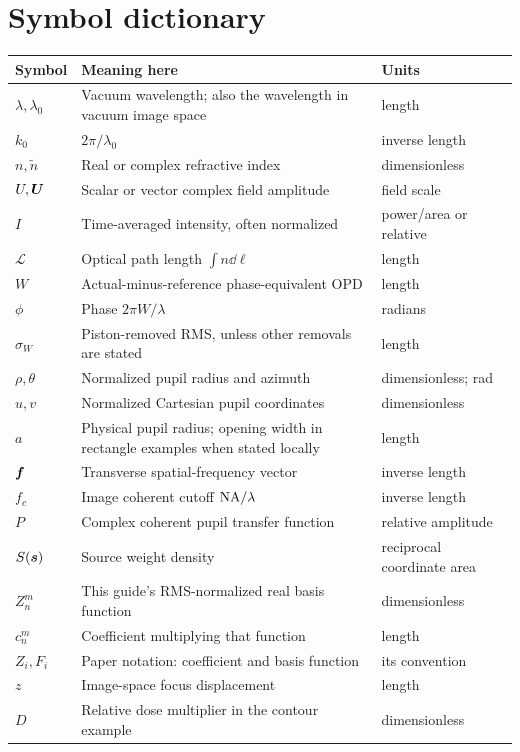 \section{Symbol dictionary}
\begin{longtable}{@{}L{.22\textwidth}L{.53\textwidth}L{.16\textwidth}@{}}
\toprule Symbol & Meaning here & Units\\ \midrule\endhead
$\lambda,\lambda_0$ & Vacuum wavelength; also the wavelength in
vacuum image space &length\\
$k_0$ &$2\pi/\lambda_0$ &inverse length\\
$n,\widetilde n$ &Real or complex refractive index &dimensionless\\
$U,\bm{U}$ &Scalar or vector complex field amplitude &field scale\\
$I$ &Time-averaged intensity, often normalized &power/area or relative\\
$\mathcal L$ &Optical path length $\int n\dd\ell$ &length\\
$W$ &Actual-minus-reference phase-equivalent OPD &length\\
$\phi$ &Phase $2\pi W/\lambda$ &radians\\
$\sigma_W$ &Piston-removed RMS, unless other removals are stated &length\\
$\rho,\theta$ &Normalized pupil radius and azimuth &dimensionless; rad\\
$u,v$ &Normalized Cartesian pupil coordinates &dimensionless\\
$a$ &Physical pupil radius; opening width in rectangle examples
when stated locally &length\\
$\bm{f}$ &Transverse spatial-frequency vector &inverse length\\
$f_c$ &Image coherent cutoff $\mathrm{NA}/\lambda$ &inverse length\\
$P$ &Complex coherent pupil transfer function &relative amplitude\\
$S(\bm{s})$ &Source weight density &reciprocal coordinate area\\
$Z_n^m$ &This guide's RMS-normalized real basis function &dimensionless\\
$c_n^m$ &Coefficient multiplying that function &length\\
$Z_i,F_i$ &Paper notation: coefficient and basis function &its convention\\
$z$ &Image-space focus displacement &length\\
$D$ &Relative dose multiplier in the contour example &dimensionless\\

\end{longtable}

